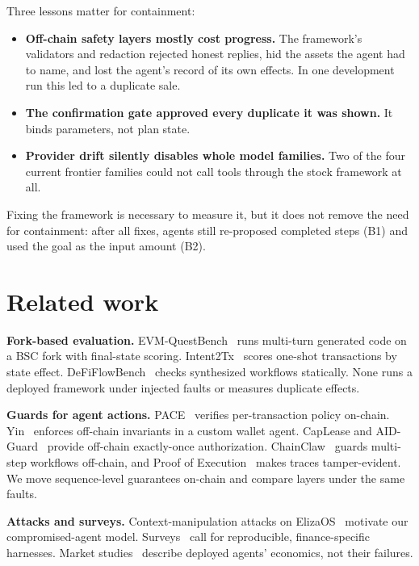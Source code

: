 \documentclass[conference]{IEEEtran}
\begin{document}
Three lessons matter for containment:
\begin{itemize}
\item \textbf{Off-chain safety layers mostly cost progress.} The framework's validators and redaction rejected honest
replies, hid the assets the agent had to name, and lost the agent's record of its own effects. In one development
run this led to a duplicate sale.
\item \textbf{The confirmation gate approved every duplicate it was shown.} It binds parameters, not plan state.
\item \textbf{Provider drift silently disables whole model families.} Two of the four current frontier families
could not call tools through the stock framework at all.
\end{itemize}
Fixing the framework is necessary to measure it, but it does not remove the need for containment: after all fixes,
agents still re-proposed completed steps (B1) and used the goal as the input amount (B2).

\section{Related work}

\textbf{Fork-based evaluation.} EVM-QuestBench~\cite{evmquestbench2026} runs multi-turn generated code on a BSC fork
with final-state scoring. Intent2Tx~\cite{intent2tx2026} scores one-shot transactions by state effect.
DeFiFlowBench~\cite{defiflowbench2026} checks synthesized workflows statically. None runs a deployed framework under
injected faults or measures duplicate effects.

\textbf{Guards for agent actions.} PACE~\cite{pace2026} verifies per-transaction policy on-chain.
Yin~\cite{yin2026invariants} enforces off-chain invariants in a custom wallet agent. CapLease and
AID-Guard~\cite{caplease2026,aidguard2026} provide off-chain exactly-once authorization. ChainClaw~\cite{chainclaw2026}
guards multi-step workflows off-chain, and Proof of Execution~\cite{poe2026} makes traces tamper-evident. We move
sequence-level guarantees on-chain and compare layers under the same faults.

\textbf{Attacks and surveys.} Context-manipulation attacks on ElizaOS~\cite{craibench2025,cryptoland2025} motivate
our compromised-agent model. Surveys~\cite{alqithami2026,sokcommerce2026} call for reproducible, finance-specific
harnesses. Market studies~\cite{papergains2026} describe deployed agents' economics, not their failures.
\end{document}
